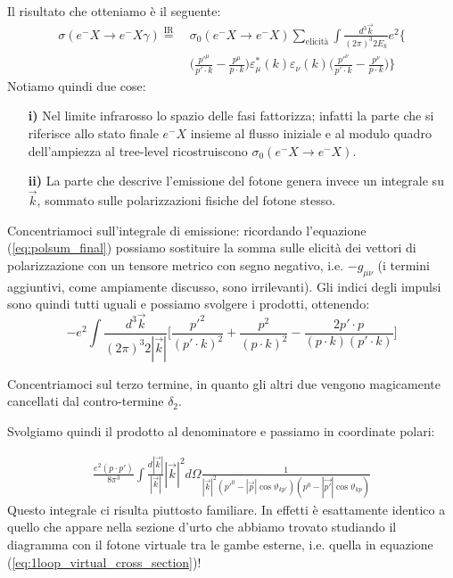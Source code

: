 \documentclass[../main.tex]{subfiles}
\begin{document}
Il risultato che otteniamo è il seguente:
\begin{equation}
    \boxed{
    \begin{aligned}
        \sigma(e^-X\rightarrow e^-X\gamma) \overset{\text{IR}}{=} ~
        &\sigma_0(e^-X\rightarrow e^-X) \sum_\text{elicità}\int \frac{d^3\Vec{k}}{(2\pi)^3 2E_k}e^2\Bigg\{ \\
        & \bigg(\frac{p'^\mu}{p'\cdot k}-\frac{p^\mu}{p\cdot k} \bigg) \varepsilon_\mu^\ast(k)\varepsilon_\nu(k) \bigg(\frac{p'^\nu}{p'\cdot k}-\frac{p^\nu}{p\cdot k}\bigg)\Bigg\}
    \end{aligned}
    }
    \label{eq:cross_section_total_realemission}
\end{equation}
Notiamo quindi due cose:
\begin{enumerate}
    \item[\textbf{i)}] Nel limite infrarosso lo spazio delle fasi fattorizza; infatti la parte che si riferisce allo stato finale \(e^-X\) insieme al flusso iniziale e al modulo quadro dell'ampiezza al tree-level ricostruiscono \(\sigma_0(e^-X\rightarrow e^-X)\).
    
    \item[\textbf{ii)}] La parte che descrive l'emissione del fotone genera invece un integrale su \(\Vec k\), sommato sulle polarizzazioni fisiche del fotone stesso.
\end{enumerate}
Concentriamoci sull'integrale di emissione: ricordando l'equazione (\ref{eq:polsum_final}) possiamo sostituire la somma sulle elicità dei vettori di polarizzazione con un tensore metrico con segno negativo, i.e. \(-g_{\mu\nu}\) (i termini aggiuntivi, come ampiamente discusso, sono irrilevanti). Gli indici degli impulsi sono quindi tutti uguali e possiamo svolgere i prodotti, ottenendo:
\[
-e^2\int \frac{d^3\Vec{k}}{(2\pi)^3 2|\Vec{k}|}\bigg[\frac{p'^2}{(p'\cdot k)^2} + \frac{p^2}{(p\cdot k)^2} -\frac{2p'\cdot p}{(p\cdot k)(p'\cdot k)}\bigg]
\]

Concentriamoci sul terzo termine, in quanto gli altri due vengono magicamente cancellati dal contro-termine \(\delta_2\).

Svolgiamo quindi il prodotto al denominatore e passiamo in coordinate polari:

\begin{align*}
    \frac{e^2(p\cdot p')}{8\pi^3}\int \frac{d|\Vec{k}|}{|\Vec{k}|}|\Vec{k}|^2d\Omega \frac{1}{|\Vec{k}|^2(p'^0-|\Vec{p}|\cos\vartheta_{kp'})(p^0-|\Vec{p'}|\cos\vartheta_{kp})}
\end{align*}
Questo integrale ci risulta piuttosto familiare. In effetti è esattamente identico a quello che appare nella sezione d'urto che abbiamo trovato studiando il diagramma con il fotone virtuale tra le gambe esterne, i.e. quella in equazione (\ref{eq:1loop_virtual_cross_section})!
\end{document}
